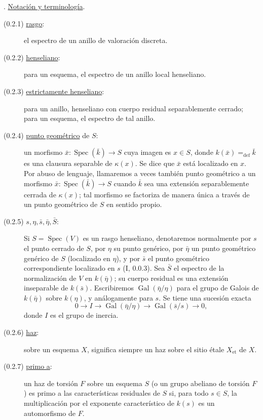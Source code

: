 \pageoriginale

\medskip
{}. \underline{Notación y terminología}.

\begin{description}
\item[(0.2.1) \underline{rasgo}:]
el espectro de un anillo de valoración discreta.

\item[(0.2.2) \underline{henseliano}:]
para un esquema, el espectro de un anillo local henseliano.

\item[(0.2.3) \underline{estrictamente henseliano}:]
para un anillo, henseliano con cuerpo residual separablemente cerrado; para
un esquema, el espectro de tal anillo.

\item[(0.2.4) \underline{punto geométrico} de $S$:]
un morfismo $\bar x:\operatorname{Spec}(\bar k)\longrightarrow S$ cuya imagen
es $x\in S$, donde $k(\bar x)=_{\mathrm{def}}\bar k$ es una clausura
separable de $\kappa(x)$. Se dice que $\bar x$ está localizado en $x$. Por
abuso de lenguaje, llamaremos a veces también punto geométrico a un morfismo
$\bar x:\operatorname{Spec}(\bar k)\longrightarrow S$ cuando $\bar k$ sea
una extensión separablemente cerrada de $\kappa(x)$; tal morfismo se
factoriza de manera única a través de un punto geométrico de $S$ en sentido
propio.

\item[(0.2.5) $s,\eta,\bar s,\bar\eta,\bar S$:]
Si $S=\operatorname{Spec}(V)$ es un rasgo henseliano, denotaremos normalmente
por $s$ el punto cerrado de $S$, por $\eta$ su punto genérico, por $\bar\eta$
un punto geométrico genérico de $S$ (localizado en $\eta$), y por $\bar s$ el
punto geométrico correspondiente localizado en $s$ (I, 0.0.3). Sea $\bar S$
el espectro de la normalización de $V$ en $k(\bar\eta)$; su cuerpo residual es
una extensión inseparable de $k(\bar s)$. Escribiremos
$\operatorname{Gal}(\bar\eta/\eta)$ para el grupo de Galois de
$k(\bar\eta)$ sobre $k(\eta)$, y análogamente para $s$. Se tiene una sucesión
exacta
\begin{equation*}
0\longrightarrow I\longrightarrow
\operatorname{Gal}(\bar\eta/\eta)\longrightarrow
\operatorname{Gal}(\bar s/s)\longrightarrow0,
\end{equation*}
donde $I$ es el grupo de inercia.

\item[(0.2.6) \underline{haz}:]
sobre un esquema $X$, significa siempre un haz sobre el sitio étale
$X_{\mathrm{et}}$ de $X$.

\item[(0.2.7) \underline{primo a}:]
un haz de torsión $F$ sobre un esquema $S$ (o un grupo abeliano de torsión
$F$) es primo a las características residuales de $S$ si, para todo
$s\in S$, la multiplicación por el exponente característico de $k(s)$ es un
automorfismo de $F$.
\end{description}

